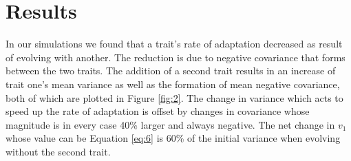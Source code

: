 \documentclass[11pt,twocolumn]{article}
\begin{document}
\section*{Results}
\label{sec:results}
In our simulations we found that a trait's rate of adaptation decreased as result of evolving with another. The reduction is due to negative covariance that forms between the two traits. The addition of a second trait results in an increase of trait one's mean variance as well as the formation of mean negative covariance, both of which are plotted in Figure \ref{fig:2}. The change in variance which acts to speed up the rate of adaptation is offset by changes in covariance whose magnitude is in every case 40\% larger and always negative. The net change in $v_1$ whose value can be  Equation \eqref{eq:6} is 60\% of the initial variance when evolving without the second trait. \par
\end{document}
